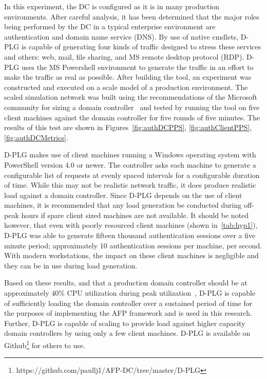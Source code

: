 In this experiment, the DC is configured as it is in many production
environments.  After careful analysis, it has been determined that the major
roles being performed by the DC in a typical enterprise environment are
authentication and domain name service (DNS).  By use of native
cmdlets, D-PLG is capable of generating four kinds of traffic designed to
stress these services and others: web, mail, file sharing, and MS remote
desktop protocol (RDP).  D-PLG uses the MS Powershell environment to generate
the traffic in an effort to make the traffic as real as possible.  After
building the tool, an experiment was constructed and executed on a scale model
of a production environment.  The scaled simulation network was built using the
recommendations of the Microsoft community for sizing a domain
controller~\cite{mak12} and tested by running the tool on five client machines
against the domain controller for five rounds of five minutes.  The results of
this test are shown in Figures~\ref{fig:authDCPPS}, \ref{fig:authClientPPS},
\ref{fig:authDCMetrics}.

\figAuthDCPPS{4in}
\figAuthClientPPS{4in}
\figAuthDCMetrics{4in}

D-PLG makes use of client machines running a Windows operating system with
PowerShell version 4.0 or newer.  The controller asks each machine to generate
a configurable list of requests at evenly spaced intervals for a configurable
duration of time.  While this may not be realistic network traffic, it does
produce realistic load against a domain controller.  Since D-PLG depends on the
use of client machines, it is recommended that any load generation be conducted
during off-peak hours if spare client sized machines are not available.  It
should be noted however, that even with poorly resourced client machines (shown
in~\ref{tab:hyp1}), D-PLG was able to generate fifteen thousand authentication
sessions over a five minute period; approximately 10 authentication sessions
per machine, per second.  With modern workstations, the impact on these client
machines is negligible and they can be in use during load generation.

Based on these results, and that a production domain controller should be at
approximately 40\% CPU utilization during peak utilization~\cite{mak12}, D-PLG
is capable of sufficiently loading the domain controller over a sustained
period of time for the purposes of implementing the AFP framework and is used
in this research.  Further, D-PLG is capable of scaling to provide load against
higher capacity domain controllers by using only a few client machines.  D-PLG
is available on
Github\footnote{https://github.com/paullj1/AFP-DC/tree/master/D-PLG} for others
to use.


